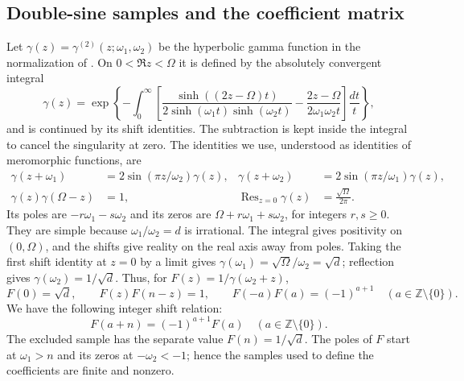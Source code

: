 \documentclass[11pt]{article}
\numberwithin{equation}{section}
\theoremstyle{definition}
\theoremstyle{remark}
\DeclareMathOperator{\Res}{Res}
\newcommand{\Z}{\mathbb Z}
\begin{document}
\subsection{Double-sine samples and the coefficient matrix}\label{coeff}

Let $\gamma(z)=\gamma^{(2)}(z;\omega_1,\omega_2)$ be the hyperbolic
gamma function in the normalization of \cite{BSS}. On
$0<\Re z<\Omega$ it is defined by the absolutely convergent integral
\[
 \gamma(z)=\exp\left\{-\int_0^\infty
 \left[\frac{\sinh((2z-\Omega)t)}
 {2\sinh(\omega_1t)\sinh(\omega_2t)}
 -\frac{2z-\Omega}{2\omega_1\omega_2t}\right]\frac{dt}{t}\right\},
\]
and is continued by its shift identities. The subtraction is kept
inside the integral to cancel the singularity at zero. The identities
we use, understood as identities of meromorphic functions, are
\begin{align}
 \gamma(z+\omega_1)&=2\sin(\pi z/\omega_2)\gamma(z),&
 \gamma(z+\omega_2)&=2\sin(\pi z/\omega_1)\gamma(z),
 \label{foundation:shifts}\\
 \gamma(z)\gamma(\Omega-z)&=1,&
 \Res_{z=0}\gamma(z)&=\frac{\sqrt\Omega}{2\pi}.
 \label{foundation:reflection}
\end{align}
Its poles are $-r\omega_1-s\omega_2$ and its zeros are
$\Omega+r\omega_1+s\omega_2$, for integers $r,s\geq0$.
They are simple because $\omega_1/\omega_2=d$ is irrational.
The integral gives positivity on $(0,\Omega)$, and the shifts give
reality on the real axis away from poles. Taking the first shift
identity at $z=0$ by a limit gives
$\gamma(\omega_1)=\sqrt\Omega/\omega_2=\sqrt d$; reflection gives
$\gamma(\omega_2)=1/\sqrt d$. Thus, for
$F(z)=1/\gamma(\omega_2+z)$,
\[
 F(0)=\sqrt d,\qquad F(z)F(n-z)=1,\qquad
 F(-a)F(a)=(-1)^{a+1}\quad(a\in\Z\setminus\{0\}).
\]
We have the following integer shift relation:
\begin{equation}\label{foundation:shift}
  F(a+n) = (-1)^{a+1}F(a)\quad(a\in\Z\setminus\{0\}).
\end{equation}
The excluded sample has the separate value $F(n)=1/\sqrt d$.
The poles of $F$ start at $\omega_1>n$ and its zeros at
$-\omega_2<-1$; hence the samples used to define the coefficients
are finite and nonzero.
\end{document}
